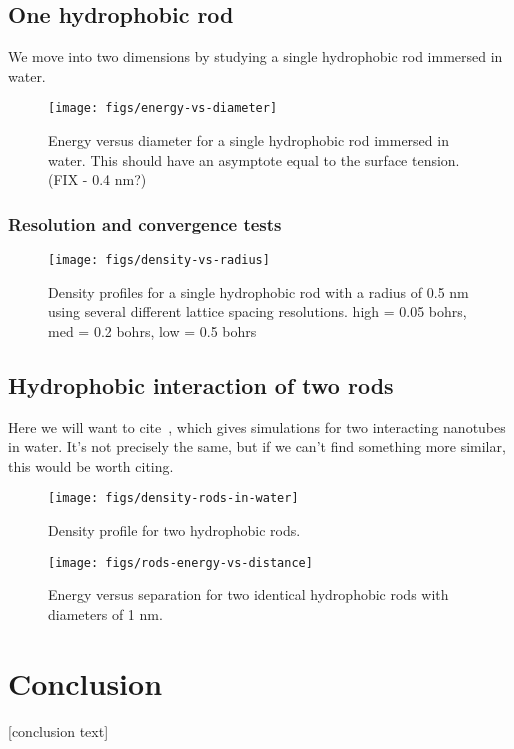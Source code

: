 \documentclass[letterpaper,twocolumn,amsmath,amssymb,prb]{revtex4-1}
\begin{document}
\subsection{One hydrophobic rod}

We move into two dimensions by studying a single hydrophobic rod
immersed in water. 

\begin{figure}
\begin{center}
\texttt{[image: figs/energy-vs-diameter]}
\end{center}
\caption{ Energy versus diameter for a single hydrophobic rod
immersed in water. This should have an asymptote equal to the surface
tension. (FIX - 0.4 nm?) }
\label{fig:energy-vs-diameter}
\end{figure}

\subsubsection{Resolution and convergence tests}

\begin{figure}
\begin{center}
\texttt{[image: figs/density-vs-radius]}
\end{center}
\caption{ Density profiles for 
a single hydrophobic rod with a radius of 0.5 nm using several different 
lattice spacing resolutions. high = 0.05 bohrs, 
med = 0.2 bohrs, low = 0.5 bohrs }
\label{fig:densityresolution}
\end{figure}

\subsection{Hydrophobic interaction of two rods}

Here we will want to cite~\cite{walther2004hydrodynamic}, which gives
simulations for two interacting nanotubes in water.  It's not
precisely the same, but if we can't find something more similar, this
would be worth citing.

\begin{figure}
\begin{center}
\texttt{[image: figs/density-rods-in-water]}
\end{center}
\caption{ Density profile for two hydrophobic rods.}
\label{fig:density-rods}
\end{figure}

\begin{figure}
\begin{center}
\texttt{[image: figs/rods-energy-vs-distance]}
\end{center}
\caption{ Energy versus separation for two identical hydrophobic rods with diameters
of 1 nm. }
\label{fig:rods-energy-vs-distance}
\end{figure}


\section{Conclusion}

[conclusion text]

\end{document}
